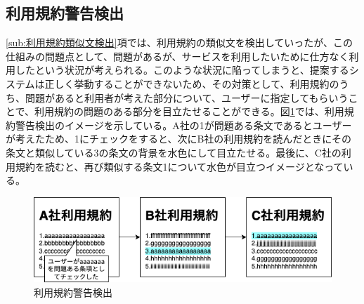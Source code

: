 \subsection{利用規約警告検出}
\label{sub:利用規約警告検出}
\ref{sub:利用規約類似文検出}項では、利用規約の類似文を検出していったが、この仕組みの問題点として、問題があるが、サービスを利用したいために仕方なく利用したという状況が考えられる。このような状況に陥ってしまうと、提案するシステムは正しく挙動することができないため、その対策として、利用規約のうち、問題があると利用者が考えた部分について、ユーザーに指定してもらいうことで、利用規約の問題のある部分を目立たせることができる。図\ref{img:demo_warning}では、利用規約警告検出のイメージを示している。A社の1が問題ある条文であるとユーザーが考えたため、1にチェックをすると、次にB社の利用規約を読んだときにその条文と類似している3の条文の背景を水色にして目立たせる。最後に、C社の利用規約を読むと、再び類似する条文1について水色が目立つイメージとなっている。
\begin{figure}[h]
  \begin{center}
      \includegraphics[width=15cm]{img/demo_warning.drawio.png}
      \caption{利用規約警告検出}
      \label{img:demo_warning}
  \end{center}
\end{figure}

